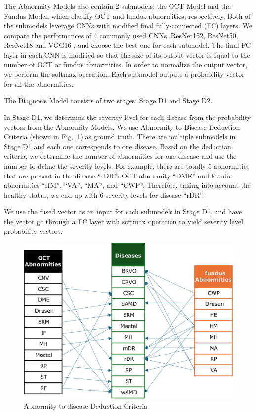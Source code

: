 \documentclass{article}
\begin{document}
	\begin{multicols}{2}
		
	The Abnormity Models also contain 2 submodels: the OCT Model and the Fundus Model, which classify OCT and fundus abnormities, respectively. Both of the submodels leverage CNNs with modified final fully-connected (FC) layers. We compare the performances of 4 commonly used CNNs, ResNet152, ResNet50, ResNet18 \autocite{He_Zhang_Ren_Sun_2016} and VGG16 \autocite{Simonyan_Zisserman_2015}, and choose the best one for each submodel. The final FC layer in each CNN is modified so that the size of its output vector is equal to the number of OCT or fundus abnormities. In order to normalize the output vector, we perform the softmax operation. Each submodel outputs a probability vector for all the abnormities.
	
	\vspace{0.5cm}
	
	The Diagnosis Model consists of two stages: Stage D1 and Stage D2. 
	
	\vspace{0.2cm}
	
	In Stage D1, we determine the severity level for each disease from the probability vectors from the Abnormity Models. We use Abnormity-to-Disease Deduction Criteria (shown in Fig.~\ref{fig:criteria}) as ground truth. There are multiple submodels in Stage D1 and each one corresponds to one disease. Based on the deduction criteria, we determine the number of abnormities for one disease and use the number to define the severity levels. For example, there are totally 5 abnormities that are present in the disease ``rDR'': OCT abnormity ``DME'' and Fundus abnormities ``HM'', ``VA'', ``MA'', and ``CWP''. Therefore, taking into account the healthy status, we end up with 6 severity levels for disease ``rDR''.

	We use the fused vector as an input for each submodels in Stage D1, and have the vector go through a FC layer with softmax operation to yield severity level probability vectors.
	
	\end{multicols}
	
	\begin{figure}[htbp]
		\centering
		\includegraphics[width=0.8\linewidth]{Figs/criteria.pdf}
		\caption{Abnormity-to-disease Deduction Criteria}
		\vspace{0.3cm}
		\label{fig:criteria}
	\end{figure}
\end{document}
